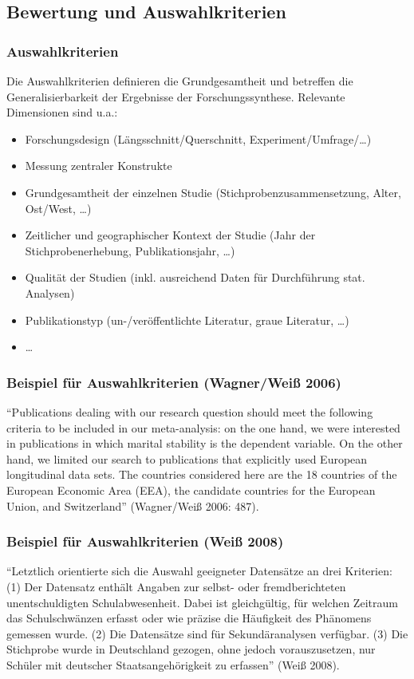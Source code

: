 \subsection{Bewertung und Auswahlkriterien}


\begin{frame}
  \frametitle{Auswahlkriterien}
  \begin{small}
    Die Auswahlkriterien definieren die Grundgesamtheit und betreffen die Generalisierbarkeit der Ergebnisse der
    Forschungssynthese. Relevante Dimensionen sind u.a.:
    \begin{itemize}[<+->]
    \item Forschungsdesign (Längsschnitt/Querschnitt, Experiment/Umfrage/\ldots)
    \item Messung zentraler Konstrukte
    \item Grundgesamtheit der einzelnen Studie (Stichprobenzusammensetzung, Alter, Ost/West, \ldots)
    \item Zeitlicher und geographischer Kontext der Studie (Jahr der Stichprobenerhebung, Publikationsjahr, \ldots)
    \item Qualität der Studien (inkl. ausreichend Daten für Durchführung stat. Analysen)
    \item Publikationstyp (un-/veröffentlichte Literatur, graue Literatur, \ldots)
    \item \ldots
    \end{itemize}
  \end{small}
\end{frame}


\begin{frame}
  \frametitle{Beispiel für Auswahlkriterien (Wagner/Weiß 2006)}
  \begin{small}
    "`Publications dealing with our research question should meet the following
    criteria to be included in our meta-analysis: on the one hand, we were
    interested in publications in which marital stability is the dependent
    variable.  On the other hand, we limited our search to publications that
    explicitly used European longitudinal data sets. The countries considered
    here are the 18 countries of the European Economic Area (EEA), the candidate
    countries for the European Union, and Switzerland"' (Wagner/Weiß 2006: 487).
  \end{small}
\end{frame}


\begin{frame}
  \frametitle{Beispiel für Auswahlkriterien (Weiß 2008)}
  "`Letztlich orientierte sich die Auswahl geeigneter Datensätze an drei
  Kriterien: (1) Der Datensatz enthält Angaben zur selbst- oder fremdberichteten
  unentschuldigten Schulabwesenheit. Dabei ist gleichgültig, für welchen
  Zeitraum das Schulschwänzen erfasst oder wie präzise die Häufigkeit des
  Phänomens gemessen wurde. (2) Die Datensätze sind für Sekundäranalysen
  verfügbar. (3) Die Stichprobe wurde in Deutschland gezogen, ohne jedoch
  vorauszusetzen, nur Schüler mit deutscher Staatsangehörigkeit zu erfassen"'
  (Weiß 2008).
    \end{frame}


